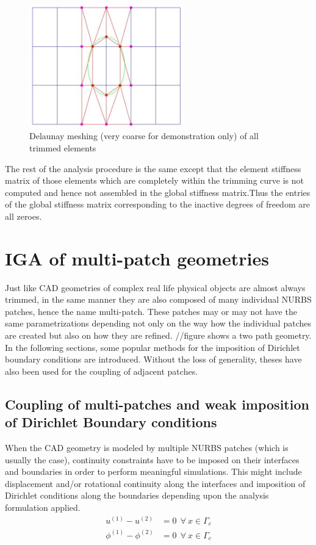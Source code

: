 \documentclass[12pt, a4paper]{report}
\begin{document}
\begin{figure}[H]
\centering
\includegraphics[width=0.6\textwidth]{Images/trim_rect_mesh_triangles.jpg}
\caption{Delaunay meshing (very coarse for demonstration only) of all trimmed elements}
\label{fig:trim_rect_delaunay}
\end{figure}
The rest of the analysis procedure is the same except that the element stiffness matrix of those elements which are completely within the trimming curve is not computed and hence not assembled in the global stiffness matrix.Thus the entries of the global stiffness matrix corresponding to the inactive degrees of freedom are all zeroes.

\chapter{IGA of multi-patch geometries} \label{chap: Multipatch IGA}
Just like CAD geometries of complex real life physical objects are almost always trimmed, in the same manner they are also composed of many individual NURBS patches, hence the name multi-patch. These patches may or may not have the same parametrizations depending not only on the way how the individual patches are created but also on how they are refined. //figure shows a two path geometry. In the following sections, some popular methods for the imposition of Dirichlet boundary conditions are introduced. Without the loss of generality, theses have also been used for the coupling of adjacent patches.
\section{Coupling of multi-patches and weak imposition of Dirichlet Boundary conditions}
When the CAD geometry is modeled by multiple NURBS patches (which is usually the case), continuity constraints have to be imposed on their interfaces and boundaries in order to perform meaningful simulations.
This might include displacement and/or rotational continuity along the interfaces and imposition of Dirichlet conditions along the boundaries depending upon the analysis formulation applied.
\begin{align}
    u^{(1)}- u^{(2)} &= 0 ~~\forall ~x \in \Gamma_c \\
    \phi^{(1)}- \phi^{(2)} &= 0 ~~\forall ~x \in \Gamma_c 
 \end{align}
\end{document}
